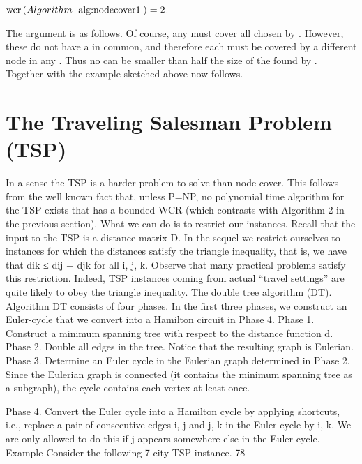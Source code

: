 \begin{theorem}
$\funm{wcr}{\algoref{nodecover1}}=2$.
\end{theorem}

The argument is as follows. Of course, any  must cover all  chosen by . However, these  do not have a  in common, and therefore each  must be covered by a different node in any . Thus no  can be smaller than half the size of the  found by . Together with the example sketched above  now follows.

\section{The Traveling Salesman Problem (TSP)}

In a sense the TSP is a harder problem to solve than node cover. This follows from the well known fact
that, unless P=NP, no polynomial time algorithm for the TSP exists that has a bounded WCR (which
contrasts with Algorithm 2 in the previous section).
What we can do is to restrict our instances. Recall that the input to the TSP is a distance matrix D. In
the sequel we restrict ourselves to instances for which the distances satisfy the triangle inequality, that is,
we have that dik ≤ dij + djk for all i, j, k. Observe that many practical problems satisfy this restriction.
Indeed, TSP instances coming from actual “travel settings” are quite likely to obey the triangle inequality.
The double tree algorithm (DT).
Algorithm DT consists of four phases. In the first three phases, we construct an Euler-cycle that we
convert into a Hamilton circuit in Phase 4.
Phase 1. Construct a minimum spanning tree with respect to the distance function d.
Phase 2. Double all edges in the tree. Notice that the resulting graph is Eulerian.
Phase 3. Determine an Euler cycle in the Eulerian graph determined in Phase 2. Since the Eulerian
graph is connected (it contains the minimum spanning tree as a subgraph), the cycle contains each vertex
at least once.

Phase 4. Convert the Euler cycle into a Hamilton cycle by applying shortcuts, i.e., replace a pair of
consecutive edges {i, j} and {j, k} in the Euler cycle by {i, k}. We are only allowed to do this if j appears
somewhere else in the Euler cycle.
Example Consider the following 7-city TSP instance.
78

